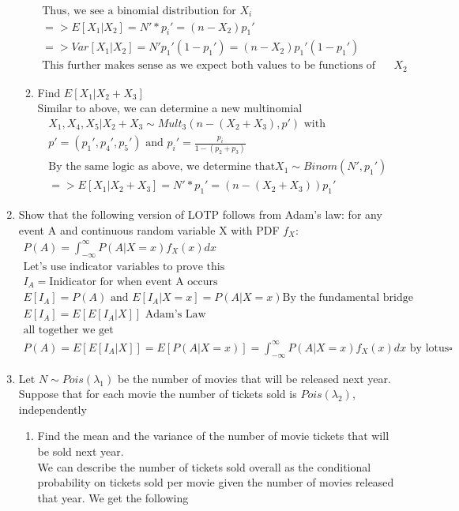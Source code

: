 \documentclass[11pt]{article}
\begin{document}
\begin{enumerate}
\begin{enumerate}
\begin{gather}
	\text{Thus, we see a binomial distribution for }X_i\\
	=> E[X_1|X_2] = N'*p_i'= (n-X_2)p_1'\\
	=> Var[X_1|X_2] = N'p_1'(1-p_1') = (n-X_2)p_1'(1-p_1')\\
	\text{This further makes sense as we expect both values to be functions of our RV } X_2
	\end{gather}
	\item Find $E[X_1|X_2+X_3]$ 
	\\
	Similar to above, we can determine a new multinomial
	\begin{gather}
	X_1,X_4,X_5 | X_2+X_3 \sim Mult_3(n-(X_2+X_3),p') \text{ with }\\
	p'=(p_1',p_4',p_5')\text{ and } p_i'= \frac{p_i}{1-(p_2+p_3)}\\
	\text{By the same logic as above, we determine that} X_1 \sim Binom(N',p_1')\\
	=>E[X_1|X_2+X_3] = N'*p_1'= (n-(X_2+X_3))p_1'
	\end{gather}
\end{enumerate}
\item Show that the following version of LOTP follows from Adam’s law: for any event A and continuous random variable X with PDF $f_X$:
\begin{gather}
	P(A) = \int_{-\infty}^{\infty}P(A|X=x)f_X(x)dx\\
	\text{Let's use indicator variables to prove this}\\
	I_A = \text{Inidicator for when event A occurs}\\
	E[I_A] = P(A) \text{ and } E[I_A|X=x]=P(A|X=x) \text{By the fundamental bridge} \\ 
	E[I_A] = E[E[I_A|X]] \text{ Adam's Law}\\
	\text{all together we get }\\
	 P(A)= E[E[I_A|X]]=E[P(A|X=x)] = \int_{-\infty}^{\infty}P(A|X=x)f_X(x)dx \text{ by lotus}\square	
\end{gather}
\item Let $N \sim Pois(\lambda_1)$ be the number of movies that will be released next year. Suppose that for each movie the number of tickets sold is $Pois(\lambda_2)$, independently
\begin{enumerate}
	\item Find the mean and the variance of the number of movie tickets that will be sold next year.
	\\
	We can describe the number of tickets sold overall as the conditional probability on tickets sold per movie given the number of movies released that year. We get the following

\end{enumerate}
\end{enumerate}
\end{document}
